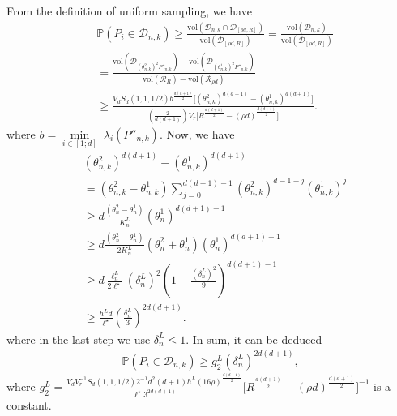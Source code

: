 \documentclass[Afour,sageh,times]{sagej}
\begin{document}
From the definition of uniform sampling, we have 
\begin{align*}
     &\mathbb{P}(P_i\in\mathcal{D}_{n,k})
     {\geq}\frac{\text{vol}(\mathcal{D}_{n,k}\cap \mathcal{D}_{[\rho d, R]})}{\text{vol}(\mathcal{D}_{[\rho d ,R]})} = \frac{\text{vol}(\mathcal{D}_{n,k})}{\text{vol}(\mathcal{D}_{[\rho d,R]})} \\
    &=\frac{\text{vol}(\mathcal{D}_{(\theta^2_{n,k})^2P''_{n,k}}) - \text{vol}(\mathcal{D}_{(\theta^1_{n,k})^2P''_{n,k}})}{\text{vol}(\mathcal{R}_{R}) - \text{vol}(\mathcal{R}_{\rho d})}\\
    &\geq\frac{V_dS_d(1,1,1/2)b^{\frac{d(d+1)}{2}}\bigg[ (\theta^2_{n,k})^{d(d+1)}- (\theta^1_{n,k})^{d(d+1)} \bigg]}{\left(\frac{2}{d(d+1)}\right)V_r \bigg[R^{\frac{d(d+1)}{2}}- (\rho d)^{\frac{d(d+1)}{2}} \bigg]}.
\end{align*}
where $b=\underset{i\in[1;d]}{\min}\;\lambda_i(P''_{n,k})$. Now, we have
\begin{align*}
    &(\theta^2_{n,k})^{d(d+1)}-(\theta^1_{n,k})^{d(d+1)} \nonumber\\
    &= (\theta^2_{n,k} - \theta^1_{n,k}) \sum_{j=0}^{d(d+1)-1} (\theta^2_{n,k})^{d-1-j}  (\theta^1_{n,k})^{j}\\
        &\geq d\frac{(\theta^2_{n}-\theta^1_{n})}{K^L_n} (\theta^1_{n})^{d(d+1)-1}\nonumber\\
        &\geq d\frac{(\theta^2_{n}-\theta^1_{n})}{2K^L_n}(\theta^2_{n}+\theta^1_{n}) (\theta^1_{n})^{d(d+1)-1}\\
    &\geq d\frac{\ell^L_n}{2\ell^\star}(\delta^L_n)^2 \left(1-\frac{(\delta_n^L)^2}{9}\right)^{d(d+1)-1}\nonumber\\
    &\geq\frac{h^Ld}{\ell^\star}\left(\frac{\delta^L_n}{3}\right)^{2d(d+1)}.\nonumber
\end{align*}
where in the last step we use $\delta^L_n\leq 1$. 
In sum, it can be deduced
\begin{align}
    \mathbb{P}(P_i\in\mathcal{D}_{n,k}) \geq g^L_2 (\delta^L_n)^{2d(d+1)},
\end{align}
where $g^L_2 = \frac{V_dV_r^{-1}S_d(1,1,1/2)2^{-1}d^2(d+1) h^L(16\rho)^{\frac{d(d+1)}{2}}}{\ell^\star 3^{2d(d+1)}} \bigg[R^{\frac{d(d+1)}{2}}- (\rho d)^{\frac{d(d+1)}{2}} \bigg]^{-1} $ is a constant. 
\end{document}
